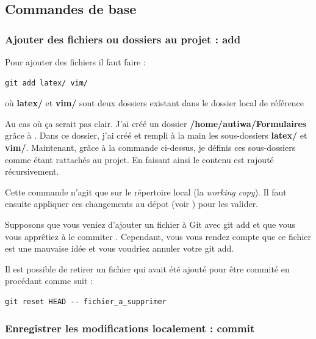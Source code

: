 \documentclass[a4paper,twoside]{article}
\begin{document}
\subsection{Commandes de base}

\subsubsection{Ajouter des fichiers ou dossiers au projet : add} 
Pour ajouter des fichiers il faut faire :
\begin{verbatim}
git add latex/ vim/ 
\end{verbatim}
où \textbf{latex/} et \textbf{vim/} sont deux dossiers existant dans le dossier local de référence

\begin{remarque}
Au cas où ça serait pas clair. J'ai créé un dossier \textbf{/home/autiwa/Formulaires} grâce à . Dans ce dossier, j'ai créé et rempli à la main les sous-dossiers \textbf{latex/} et \textbf{vim/}. Maintenant, grâce à la commande ci-dessus, je définis ces sous-dossiers comme étant rattachés au projet. En faisant ainsi le contenu est rajouté récursivement.
\end{remarque}

\begin{attention}
Cette commande n'agit que sur le répertoire local (la \emph{working copy}). Il faut ensuite appliquer ces changements au dépot (voir ) pour les valider.
\end{attention}

\bigskip

Supposons que vous veniez d'ajouter un fichier à Git avec git add et que vous vous apprêtiez à le \og commiter \fg. Cependant, vous vous rendez compte que ce fichier est une mauvaise idée et vous voudriez annuler votre git add.

Il est possible de retirer un fichier qui avait été ajouté pour être \og commité \fg en procédant comme suit :
\begin{verbatim}
git reset HEAD -- fichier_a_supprimer
\end{verbatim}

\subsubsection{Enregistrer les modifications localement : commit}\label{sec:commit}
\end{document}
